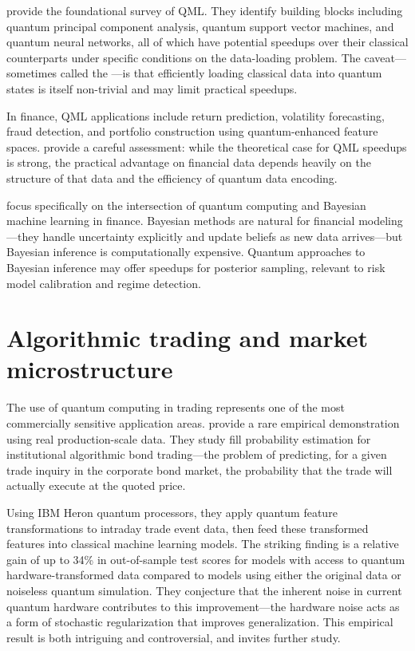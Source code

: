 \citet{biamonte_quantum_2017} provide the foundational survey of QML. They identify building blocks including quantum principal component analysis, quantum support vector machines, and quantum neural networks, all of which have potential speedups over their classical counterparts under specific conditions on the data-loading problem. The caveat---sometimes called the ---is that efficiently loading classical data into quantum states is itself non-trivial and may limit practical speedups.

In finance, QML applications include return prediction, volatility forecasting, fraud detection, and portfolio construction using quantum-enhanced feature spaces. \citet{herman_quantum_2023} provide a careful assessment: while the theoretical case for QML speedups is strong, the practical advantage on financial data depends heavily on the structure of that data and the efficiency of quantum data encoding.

\citet{samal_quantum_2024} focus specifically on the intersection of quantum computing and Bayesian machine learning in finance. Bayesian methods are natural for financial modeling---they handle uncertainty explicitly and update beliefs as new data arrives---but Bayesian inference is computationally expensive. Quantum approaches to Bayesian inference may offer speedups for posterior sampling, relevant to risk model calibration and regime detection.

\section{Algorithmic trading and market microstructure}

The use of quantum computing in trading represents one of the most commercially sensitive application areas. \citet{ciceri_enhanced_2025} provide a rare empirical demonstration using real production-scale data. They study fill probability estimation for institutional algorithmic bond trading---the problem of predicting, for a given trade inquiry in the corporate bond market, the probability that the trade will actually execute at the quoted price.


Using IBM Heron quantum processors, they apply quantum feature transformations to intraday trade event data, then feed these transformed features into classical machine learning models. The striking finding is a relative gain of up to 34\% in out-of-sample test scores for models with access to quantum hardware-transformed data compared to models using either the original data or noiseless quantum simulation. They conjecture that the inherent noise in current quantum hardware contributes to this improvement---the hardware noise acts as a form of stochastic regularization that improves generalization. This empirical result is both intriguing and controversial, and invites further study.

